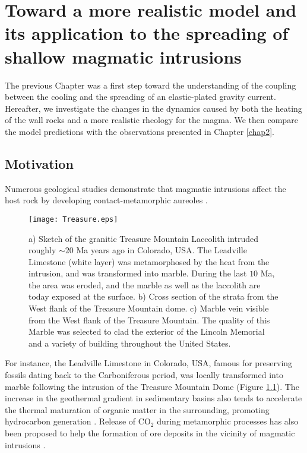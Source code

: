 \chapter[Toward a more realistic model]{Toward a more realistic model and its application to the
  spreading of shallow magmatic intrusions}
\label{Heating}

\minitoc

The previous Chapter was a first  step toward the understanding of the
coupling between  the cooling and  the spreading of  an elastic-plated
gravity  current.   Hereafter,  we  investigate  the  changes  in  the
dynamics  caused by  both the  heating of  the wall  rocks and  a more
realistic  rheology  for  the  magma.    We  then  compare  the  model
predictions with the observations presented in Chapter \ref{chap2}.


\section{Motivation}
\label{sec:introduction}

Numerous  geological  studies  demonstrate  that  magmatic  intrusions
affect  the  host  rock  by  developing  contact-metamorphic  aureoles
\citep{Jaeger:1959du,Galushkin:1997dy,Senger:2014tt}.  
\begin{figure}[h!]
  \begin{center}
    \graphicspath{ {/Users/thorey/Documents/These/Manuscript/Figure/Chapter4/} }
    \texttt{[image: Treasure.eps]}
    \caption{a)  Sketch of  the granitic  Treasure Mountain  Laccolith
      intruded roughly  $\sim 20$ Ma  years ago in Colorado,  USA. The
      Leadville Limestone (white layer)  was metamorphosed by the heat
      from the intrusion, and was transformed into marble.  During the
      last $10$ Ma, the area was eroded, and the marble as well as the
      laccolith are today exposed at the surface.  b) Cross section of
      the strata from the West flank of the Treasure Mountain dome. c)
      Marble  vein  visible  from  the  West  flank  of  the  Treasure
      Mountain. The  quality of this  Marble was selected to  clad the
      exterior  of the  Lincoln  Memorial and  a  variety of  building
      throughout the United States.}
    \label{Treasure}
  \end{center}
\end{figure}
 For  instance,
the  Leadville  Limestone  in  Colorado, USA,  famous  for  preserving
fossils  dating   back  to  the  Carboniferous   period,  was  locally
transformed  into  marble  following  the intrusion  of  the  Treasure
Mountain Dome (Figure \ref{Treasure}).  The increase in the geothermal
gradient in  sedimentary basins also  tends to accelerate  the thermal
maturation of organic matter in the surrounding, promoting hydrocarbon
generation   \citep{Senger:2014tt}.    Release    of   CO$_2$   during
metamorphic processes has also been  proposed to help the formation of
ore    deposits   in    the    vicinity    of   magmatic    intrusions
\citep{SILLITOE:1998bs,Ganino:2008ft,Zhou:2008hc}.

